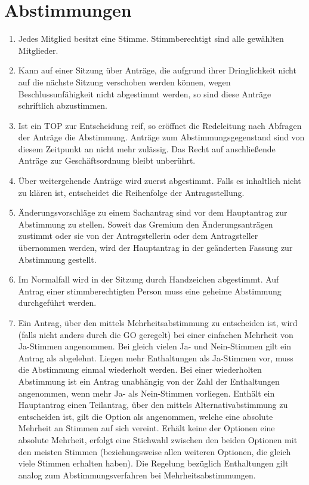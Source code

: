 \section{Abstimmungen}
\label{sec:abstimmungen}
\begin{enumerate}
	\item Jedes Mitglied besitzt eine Stimme.
	Stimmberechtigt sind alle gewählten Mitglieder.
	\item \label{item:Sitzungsbeginn} Kann auf einer Sitzung über Anträge, die aufgrund ihrer Dringlichkeit nicht auf die nächste Sitzung verschoben werden können, wegen Beschlussunfähigkeit nicht abgestimmt werden, so sind diese Anträge schriftlich abzustimmen.
	\item Ist ein TOP zur Entscheidung reif, so eröffnet die Redeleitung nach Abfragen der Anträge die Abstimmung.
	Anträge zum Abstimmungsgegenstand sind von diesem Zeitpunkt an nicht mehr zulässig.
	Das Recht auf anschließende Anträge zur Geschäftsordnung bleibt unberührt.
	\item Über weitergehende Anträge wird zuerst abgestimmt.
	Falls es inhaltlich nicht zu klären ist, entscheidet die Reihenfolge der Antragsstellung.
	\item Änderungsvorschläge zu einem Sachantrag sind vor dem Hauptantrag zur Abstimmung zu stellen.
	Soweit das Gremium den Änderungsanträgen zustimmt oder sie von der Antragstellerin oder dem Antragsteller übernommen werden, wird der Hauptantrag in der geänderten Fassung zur Abstimmung gestellt.
	\item Im Normalfall wird in der Sitzung durch Handzeichen abgestimmt.
	Auf Antrag einer stimmberechtigten Person muss eine geheime Abstimmung durchgeführt werden.
	\item Ein Antrag, über den mittels Mehrheitsabstimmung zu entscheiden ist, wird (falls nicht anders durch die GO geregelt) bei einer einfachen Mehrheit von Ja-Stimmen angenommen. Bei gleich vielen Ja- und Nein-Stimmen gilt ein Antrag als abgelehnt. Liegen mehr Enthaltungen als Ja-Stimmen vor, muss die Abstimmung einmal wiederholt werden. Bei einer wiederholten Abstimmung ist ein Antrag unabhängig von der Zahl der Enthaltungen angenommen, wenn mehr Ja- als Nein-Stimmen vorliegen. Enthält ein Hauptantrag einen Teilantrag, über den mittels Alternativabstimmung zu entscheiden ist, gilt die Option als angenommen, welche eine absolute Mehrheit an Stimmen auf sich vereint. Erhält keine der Optionen eine absolute Mehrheit, erfolgt eine Stichwahl zwischen den beiden Optionen mit den meisten Stimmen (beziehungsweise allen weiteren Optionen, die gleich viele Stimmen erhalten haben). Die Regelung bezüglich Enthaltungen gilt analog zum Abstimmungsverfahren bei Mehrheitsabstimmungen.
	\label{item:abstimmungsmodus}
\end{enumerate}

